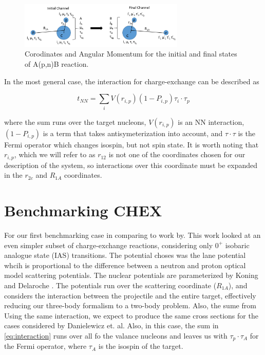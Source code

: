 \documentclass{article}
\begin{document}
\begin{figure}[H]
	\centering 
    \includegraphics[width=0.7\textwidth]{Coordinates.png}
    \caption{Corodinates and Angular Momentum for the initial and final states of A(p,n)B reaction.}
    \label{fig:coordinates}
\end{figure}

In the most general case, the interaction for charge-exchange can be described as 

\begin{equation} \label{eq:interaction}
t_{NN}=\sum_{i} V(r_{i,p})(1-P_{i,p}) \tau_i \cdot \tau_p
\end{equation}

where the sum runs over the target nucleons, $V(r_{i,p})$ is an NN interaction, $(1-P_{i,p})$ is a term that takes antisymeterization into account, and $\tau \cdot \tau$ is the Fermi operator which changes isospin, but not spin state.  It is worth noting that $r_{i,p}$, which we will refer to as $r_{12}$ is not one of the coordinates chosen for our description of the system, so interactions over this coordinate must be expanded in the $r_{2c}$ and $R_{1A}$ coordinates.

\section{Benchmarking CHEX}

For our first benchmarking case in comparing to work by\cite{Danielewicz2016}.  This work looked at an even simpler subset of charge-exchange reactions, considering only $0^+$ isobaric analogue state (IAS) transitions.  The potential choses was the lane potential whcih is proportional to the difference between a neutron and proton optical model scattering potentials.  The nuclear potentials are parameterized by Koning and Delaroche \cite{KD2003}.  The potentials run over the scattering coordinate ($R_{1A}$), and considers the interaction between the projectile and the entire target, effectively reducing our three-body formalism to a two-body problem.  Also, the sume from  Using the same interaction, we expect to produce the same cross sections for the cases considered by Danielewicz et. al.  Also, in this case, the sum in \ref{eq:interaction} runs over all fo the valance nucleons and leaves us with $\tau_p \cdot \tau_{A}$ for the Fermi operator, where $\tau_A$ is the isospin of the target.
\end{document}
